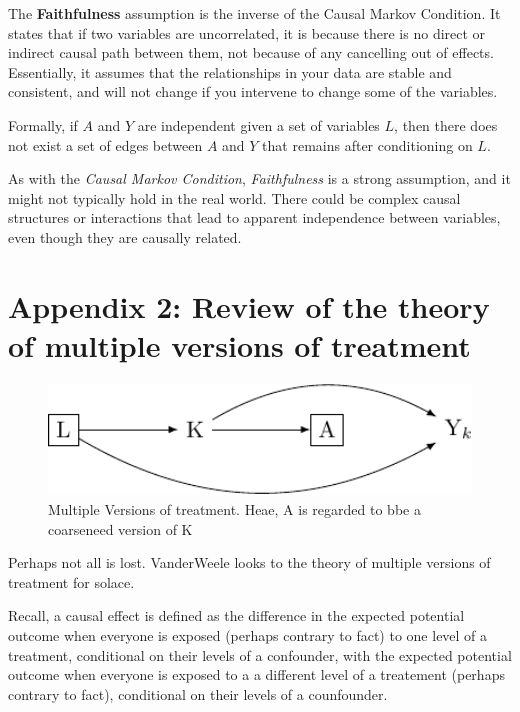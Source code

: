 \documentclass[
  singlecolumn]{report}
\begin{document}
The \textbf{Faithfulness} assumption is the inverse of the Causal Markov
Condition. It states that if two variables are uncorrelated, it is
because there is no direct or indirect causal path between them, not
because of any cancelling out of effects. Essentially, it assumes that
the relationships in your data are stable and consistent, and will not
change if you intervene to change some of the variables.

Formally, if \(A\) and \(Y\) are independent given a set of variables
\(L\), then there does not exist a set of edges between \(A\) and \(Y\)
that remains after conditioning on \(L\).

As with the \emph{Causal Markov Condition}, \emph{Faithfulness} is a
strong assumption, and it might not typically hold in the real world.
There could be complex causal structures or interactions that lead to
apparent independence between variables, even though they are causally
related.

\hypertarget{appendix-2-review-of-the-theory-of-multiple-versions-of-treatment}{%
\section{Appendix 2: Review of the theory of multiple versions of
treatment}\label{appendix-2-review-of-the-theory-of-multiple-versions-of-treatment}}

\begin{figure}

{\centering \includegraphics[width=1\textwidth,height=\textheight]{causal-dags_files/figure-pdf/fig_dag_multiple_version_treatment_dag-1.pdf}

}

\caption{Multiple Versions of treatment. Heae, A is regarded to bbe a
coarseneed version of K}

\end{figure}

Perhaps not all is lost. VanderWeele looks to the theory of multiple
versions of treatment for solace.

Recall, a causal effect is defined as the difference in the expected
potential outcome when everyone is exposed (perhaps contrary to fact) to
one level of a treatment, conditional on their levels of a confounder,
with the expected potential outcome when everyone is exposed to a a
different level of a treatement (perhaps contrary to fact), conditional
on their levels of a counfounder.
\end{document}
